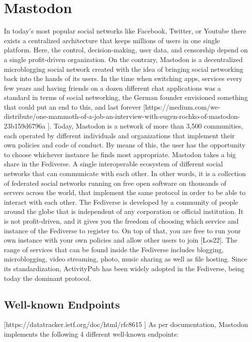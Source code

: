 \section{Mastodon}
In today's most popular social networks like Facebook, Twitter, or Youtube there exists a centralized architecture that keeps millions of users in one single platform. Here, the control, decision-making, user data, and censorship depend on a single profit-driven organization. On the contrary, Mastodon is a decentralized microblogging social network created with the idea of bringing social networking back into the hands of its users. In the time when switching apps, services every few years and having friends on a dozen different chat applications was a standard in terms of social networking, the German founder envisioned something that could put an end to this, and last forever [https://medium.com/we-distribute/one-mammoth-of-a-job-an-interview-with-eugen-rochko-of-mastodon-23b159d6796a ]. Today, Mastodon is a network of more than 3,500 communities, each operated by different individuals and organizations that implement their own policies and code of conduct. By means of this,  the user has the opportunity to choose whichever instance he finds most appropriate.
Mastodon takes a big share in the Fediverse. A single interoperable ecosystem of different social networks that can communicate with each other. In other words, it is a collection of federated social networks running on free open software on thousands of servers across the world, that implement the same protocol in order to be able to interact with each other. The Fediverse is developed by a community of people around the globe that is independent of any corporation or official institution. It is not profit-driven, and it gives you the freedom of choosing which service and instance of the Fediverse to register to. On top of that, you are free to run your own instance with your own policies and allow other users to join [Los22]. The range of services that can be found inside the Fediverse includes blogging, microblogging, video streaming, photo, music sharing as well as file hosting. Since its standardization, ActivityPub has been widely adopted in the Fediverse, being today the dominant protocol.

\subsection{Well-known Endpoints}
[https://datatracker.ietf.org/doc/html/rfc8615 ]
As per documentation, Mastodon implements the following 4 different well-known endpoints: 

